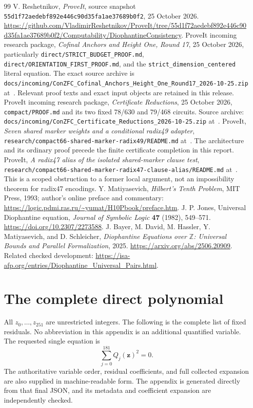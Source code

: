 \documentclass[11pt,letterpaper]{article}
\theoremstyle{remark}\newtheorem{remark}[theorem]{Remark}
\newcommand{\Z}{\mathbb Z}\newcommand{\N}{\mathbb N}
\newcommand{\file}[1]{\nolinkurl{#1}}
\newcommand{\sourcepin}{\nolinkurl{55d1f72aedebf892e446c90d35fa1ae37689b0f2}}
\begin{document}
\begin{thebibliography}{99}
 V. Reshetnikov, \emph{ProveIt}, source snapshot
\sourcepin, 25 October 2026.
\url{https://github.com/VladimirReshetnikov/ProveIt/tree/55d1f72aedebf892e446c90d35fa1ae37689b0f2/Computability/DiophantineConsistency}.
 ProveIt incoming research package,
\emph{Cofinal Anchors and Height One, Round 17}, 25 October 2026,
particularly \file{direct/STRICT_BUDGET_PROOF.md},
\file{direct/ORIENTATION_FIRST_PROOF.md}, and the
\file{strict_dimension_centered} literal equation. The exact source
archive is \file{docs/incoming/ConZFC_Cofinal_Anchors_Height_One_Round17_2026-10-25.zip}
at~\cite{repository}. Relevant proof texts and exact input objects are
retained in this release.
 ProveIt incoming research package,
\emph{Certificate Reductions}, 25 October 2026,
\file{compact/PROOF.md} and its two fixed 78/630 and 79/468 circuits.
Source archive: \file{docs/incoming/ConZFC_Certificate_Reductions_2026-10-25.zip}
at~\cite{repository}.
 ProveIt, \emph{Seven shared marker weights and a
conditional radix49 adapter},
\file{research/compact66-shared-marker-radix49/README.md} at~\cite{repository}.
The architecture and its ordinary proof precede the finite certificate
completion in this report.
 ProveIt, \emph{A radix47 alias of the
isolated shared-marker clause test},
\file{research/compact66-shared-marker-radix47-clause-alias/README.md}
at~\cite{repository}. This is a scoped obstruction to a former local
argument, not an impossibility theorem for radix47 encodings.
 Y. Matiyasevich, \emph{Hilbert's Tenth Problem},
MIT Press, 1993; author's online preface and commentary:
\url{https://logic.pdmi.ras.ru/~yumat/H10Pbook/preface.htm}.
 J. P. Jones, Universal Diophantine equation,
\emph{Journal of Symbolic Logic} \textbf{47} (1982), 549--571.
\url{https://doi.org/10.2307/2273588}.
 J. Bayer, M. David, M. Hassler, Y. Matiyasevich, and
D. Schleicher, \emph{Diophantine Equations over $\Z$: Universal Bounds
and Parallel Formalization}, 2025.
\url{https://arxiv.org/abs/2506.20909}.
Related checked development:
\url{https://isa-afp.org/entries/Diophantine_Universal_Pairs.html}.
\end{thebibliography}

\appendix
\section{The complete direct polynomial}\label{app:residuals}

All $z_0,\ldots,z_{251}$ are unrestricted integers. The following is the
complete list of fixed residuals. No abbreviation in this appendix is
an additional quantified variable. The requested single equation is
\[
 \boxed{\displaystyle\sum_{j=0}^{181}Q_j(\mathbf z)^2=0.}
\]
The authoritative variable order, residual coefficients, and full
collected expansion are also supplied in machine-readable form. The
appendix is generated directly from that final JSON, and its metadata
and coefficient expansion are independently checked.


\end{document}
